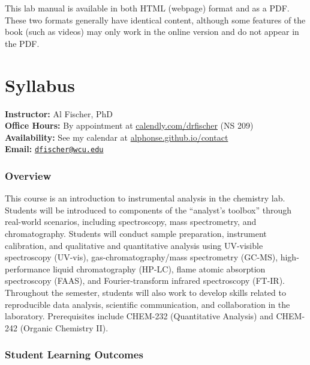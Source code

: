 \documentclass[]{tufte-book}
\begin{document}
This lab manual is available in both HTML (webpage) format and as a PDF. These two formats generally have identical content, although some features of the book (such as videos) may only work in the online version and do not appear in the PDF.

\hypertarget{syllabus}{%
\chapter*{Syllabus}\label{syllabus}}

\textbf{Instructor:} Al Fischer, PhD\\
\textbf{Office Hours:} By appointment at \href{http://www.calendly.com/drfischer}{calendly.com/drfischer} (NS 209)\\
\textbf{Availability:} See my calendar at \href{\%7B\%7Bsite.baseurl\%7D\%7D/contact}{alphonse.github.io/contact}\\
\textbf{Email:} \href{mailto:dfischer@wcu.edu}{\nolinkurl{dfischer@wcu.edu}}

\hypertarget{overview}{%
\subsection*{Overview}\label{overview}}

This course is an introduction to instrumental analysis in the chemistry lab. Students will be introduced to components of the ``analyst's toolbox'' through real-world scenarios, including spectroscopy, mass spectrometry, and chromatography. Students will conduct sample preparation, instrument calibration, and qualitative and quantitative analysis using UV-visible spectroscopy (UV-vis), gas-chromatography/mass spectrometry (GC-MS), high-performance liquid chromatography (HP-LC), flame atomic absorption spectroscopy (FAAS), and Fourier-transform infrared spectroscopy (FT-IR). Throughout the semester, students will also work to develop skills related to reproducible data analysis, scientific communication, and collaboration in the laboratory. Prerequisites include CHEM-232 (Quantitative Analysis) and CHEM-242 (Organic Chemistry II).

\hypertarget{student-learning-outcomes}{%
\subsection*{Student Learning Outcomes}\label{student-learning-outcomes}}
\end{document}
